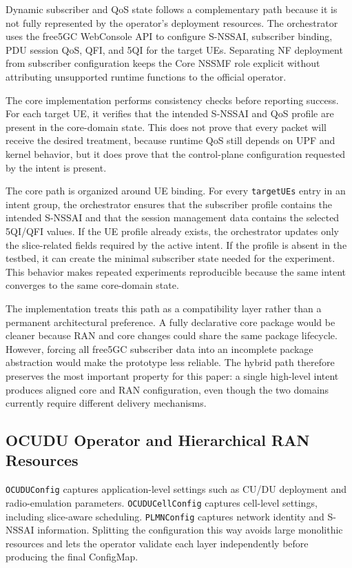 Dynamic subscriber and QoS state follows a complementary path because it is not fully represented by the operator's deployment resources. The orchestrator uses the free5GC WebConsole API to configure S-NSSAI, subscriber binding, PDU session QoS, QFI, and 5QI for the target UEs. Separating NF deployment from subscriber configuration keeps the Core NSSMF role explicit without attributing unsupported runtime functions to the official operator.

The core implementation performs consistency checks before reporting success. For each target UE, it verifies that the intended S-NSSAI and QoS profile are present in the core-domain state. This does not prove that every packet will receive the desired treatment, because runtime QoS still depends on UPF and kernel behavior, but it does prove that the control-plane configuration requested by the intent is present.

The core path is organized around UE binding. For every \texttt{targetUEs} entry in an intent group, the orchestrator ensures that the subscriber profile contains the intended S-NSSAI and that the session management data contains the selected 5QI/QFI values. If the UE profile already exists, the orchestrator updates only the slice-related fields required by the active intent. If the profile is absent in the testbed, it can create the minimal subscriber state needed for the experiment. This behavior makes repeated experiments reproducible because the same intent converges to the same core-domain state.

The implementation treats this path as a compatibility layer rather than a permanent architectural preference. A fully declarative core package would be cleaner because RAN and core changes could share the same package lifecycle. However, forcing all free5GC subscriber data into an incomplete package abstraction would make the prototype less reliable. The hybrid path therefore preserves the most important property for this paper: a single high-level intent produces aligned core and RAN configuration, even though the two domains currently require different delivery mechanisms.

\subsection{OCUDU Operator and Hierarchical RAN Resources}

\texttt{OCUDUConfig} captures application-level settings such as CU/DU deployment and radio-emulation parameters. \texttt{OCUDUCellConfig} captures cell-level settings, including slice-aware scheduling. \texttt{PLMNConfig} captures network identity and S-NSSAI information. Splitting the configuration this way avoids large monolithic resources and lets the operator validate each layer independently before producing the final ConfigMap.

